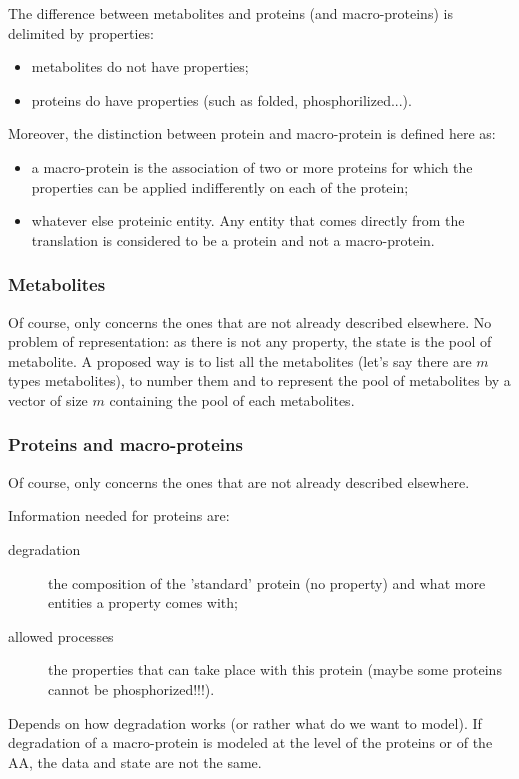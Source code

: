 The difference between metabolites and proteins (and macro-proteins) is delimited by properties:
\begin{itemize}
  \item metabolites do not have properties;
  \item proteins do have properties (such as folded, phosphorilized...).
\end{itemize}
Moreover, the distinction between protein and macro-protein is defined here as:
\begin{itemize}
  \item a macro-protein is the association of two or more proteins for which the properties can be applied indifferently on each of the protein;
  \item whatever else proteinic entity. Any entity that comes directly from the translation is considered to be a protein and not a macro-protein.
\end{itemize}

\subsubsection{Metabolites}
Of course, only concerns the ones that are not already described elsewhere. No problem of representation: as there is not any property, the state is the pool of metabolite. A proposed way is to list all the metabolites (let's say there are $m$ types metabolites), to number them and to represent the pool of metabolites by a vector of size $m$ containing the pool of each metabolites.

\subsubsection{Proteins and macro-proteins}
Of course, only concerns the ones that are not already described elsewhere.

\medskip

Information needed for proteins are:
\begin{description}
  \item[degradation] the composition of the 'standard' protein (no property) and what more entities a property comes with;
  \item[allowed processes] the properties that can take place with this protein (maybe some proteins cannot be phosphorized!!!).
\end{description}

\medskip

Depends on how degradation works (or rather what do we want to model). If degradation of a macro-protein is modeled at the level of the proteins or of the AA, the data and state are not the same. 


